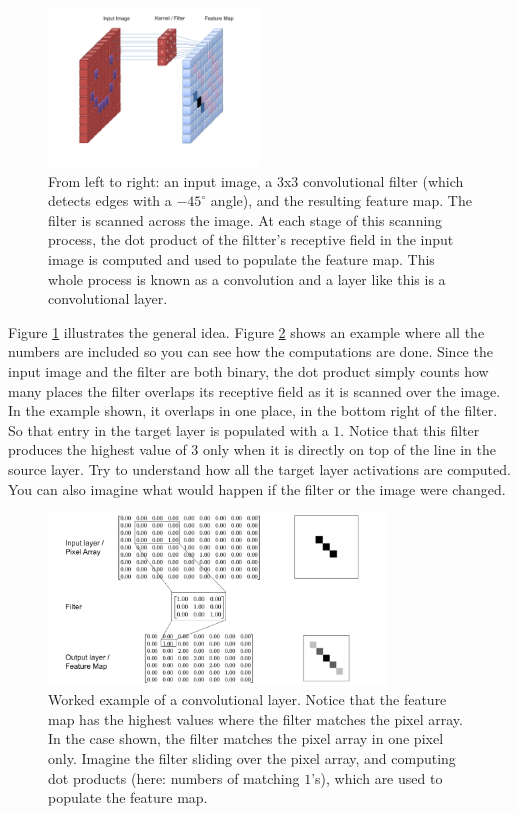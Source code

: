 \begin{figure}[h]
\centering
\includegraphics[width=0.5\textwidth]{images/CNN_Filter.png}
\caption[User Cecbur, \url{https://commons.wikimedia.org/wiki/File:Convolutional_Neural_Network_NeuralNetworkFilter.gif}, with labels added by Jeff Yoshimi.]{From left to right: an input image, a 3x3 convolutional filter (which detects edges with a $-45^\circ$ angle), and the resulting feature map. The filter is scanned across the image. At each stage of this scanning process, the dot product of the filtter's receptive field in the input image is computed and used to populate the feature map. This whole process is known as a convolution and a layer like this is a convolutional layer.}
\label{cnn_filter}
\end{figure}

Figure \ref{cnn_filter} illustrates the general idea. Figure \ref{cnn_workedExample} shows an example where all the numbers are included so you can see how the computations are done. Since the input image and the filter are both binary, the dot product simply counts how many places the filter overlaps its receptive field as it is scanned over the image. In the example shown, it overlaps in one place, in the bottom right of the filter.  So that entry in the target layer is populated with a $1$.  Notice that this filter produces the highest value of $3$ only when it is directly on top of the line in the source layer. Try to understand how all the target layer activations are computed. You can also imagine what would happen if the filter or the image were changed.

\begin{figure}[h]
\centering
\includegraphics[width=0.8\textwidth]{images/CNN_WorkedExample.png}
\caption[Jeff Yoshimi]{Worked example of a convolutional layer. Notice that the feature map has the highest values where the filter matches the pixel array. In the case shown, the filter matches the pixel array in one pixel only. Imagine the filter sliding over the pixel array, and computing dot products (here: numbers of matching $1$'s), which are used to populate the feature map.}
\label{cnn_workedExample}
\end{figure}


